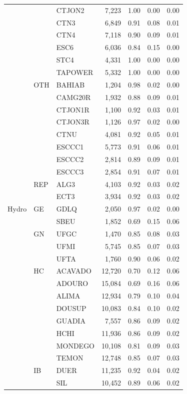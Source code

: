 \begin{tabular}{l l l r r r r}
 &  & CTJON2 & 7,223 & 1.00 & 0.00 & 0.00 \\
 &  & CTN3 & 6,849 & 0.91 & 0.08 & 0.01 \\
 &  & CTN4 & 7,118 & 0.90 & 0.09 & 0.01 \\
 &  & ESC6 & 6,036 & 0.84 & 0.15 & 0.00 \\
 &  & STC4 & 4,331 & 1.00 & 0.00 & 0.00 \\
 &  & TAPOWER & 5,332 & 1.00 & 0.00 & 0.00 \\
 & OTH & BAHIAB & 1,204 & 0.98 & 0.02 & 0.00 \\
 &  & CAMG20R & 1,932 & 0.88 & 0.09 & 0.01 \\
 &  & CTJON1R & 1,100 & 0.92 & 0.03 & 0.01 \\
 &  & CTJON3R & 1,126 & 0.97 & 0.02 & 0.00 \\
 &  & CTNU & 4,081 & 0.92 & 0.05 & 0.01 \\
 &  & ESCCC1 & 5,773 & 0.91 & 0.06 & 0.01 \\
 &  & ESCCC2 & 2,814 & 0.89 & 0.09 & 0.01 \\
 &  & ESCCC3 & 2,854 & 0.91 & 0.07 & 0.01 \\
 & REP & ALG3 & 4,103 & 0.92 & 0.03 & 0.02 \\
 &  & ECT3 & 3,934 & 0.92 & 0.03 & 0.02 \\
\addlinespace
Hydro & GE & GDLQ & 2,050 & 0.97 & 0.02 & 0.00 \\
 &  & SBEU & 1,852 & 0.69 & 0.15 & 0.06 \\
 & GN & UFGC & 1,470 & 0.85 & 0.08 & 0.03 \\
 &  & UFMI & 5,745 & 0.85 & 0.07 & 0.03 \\
 &  & UFTA & 1,760 & 0.90 & 0.06 & 0.02 \\
 & HC & ACAVADO & 12,720 & 0.70 & 0.12 & 0.06 \\
 &  & ADOURO & 15,084 & 0.69 & 0.16 & 0.06 \\
 &  & ALIMA & 12,934 & 0.79 & 0.10 & 0.04 \\
 &  & DOUSUP & 10,083 & 0.84 & 0.10 & 0.02 \\
 &  & GUADIA & 7,557 & 0.86 & 0.09 & 0.02 \\
 &  & HCHI & 11,936 & 0.86 & 0.09 & 0.02 \\
 &  & MONDEGO & 10,108 & 0.81 & 0.09 & 0.03 \\
 &  & TEMON & 12,748 & 0.85 & 0.07 & 0.03 \\
 & IB & DUER & 11,235 & 0.92 & 0.04 & 0.02 \\
 &  & SIL & 10,452 & 0.89 & 0.06 & 0.02 \\

\end{tabular}
